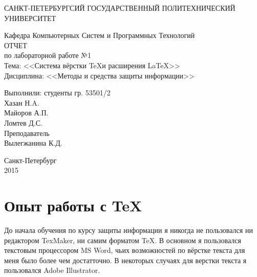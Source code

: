\documentclass[utf8x, 12pt]{G7-32}
\begin{document}
\frontmatter 


\begin{center} 

\large САНКТ-ПЕТЕРБУРГСИЙ ГОСУДАРСТВЕННЫЙ ПОЛИТЕХНИЧЕСКИЙ УНИВЕРСИТЕТ

\large Кафедра Компьютерных Систем и Программных Технологий \\[5.5cm] 

\huge ОТЧЕТ \\[0.6cm] %
\large по лабораторной работе №1\\
\large Тема: <<Система вёрстки \TeX и расширения \LaTeX>>\\
\large Дисциплина: <<Методы и средства защиты информации>>\\[3.7cm]

\end{center} 

\begin{flushright}
Выполнили: студенты гр. 53501/2 \\
Хазан Н.A.\\
Майоров А.П.\\
Ломтев Д.С. \\[1.2cm]


Преподаватель \\
Вылегжанина К.Д.
\end{flushright}


\vfill 

\begin{center} 
\large Санкт-Петербург \\
2015
\end{center} 

\thispagestyle{empty}



\thispagestyle{empty}
\setcounter{page}{0}
\tableofcontents
\clearpage
\mainmatter



\chapter{Опыт работы с \TeX}

До начала обучения по курсу защиты информации я никогда не пользовался ни редактором TexMaker, ни самим форматом \TeX . В основном я пользовался текстовым процессором MS Word, чьих возможностей по вёрстке текста для меня было более чем достатточно. \hfil\break
В некоторых случаях для верстки текста я пользовался Adobe Illustrator.
\end{document}
